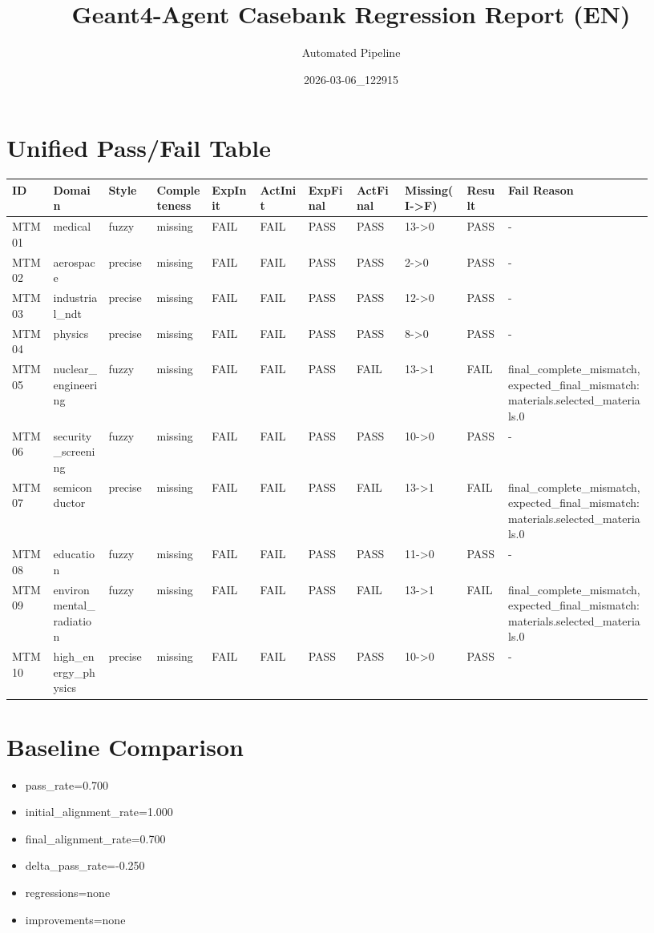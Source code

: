 \documentclass[11pt]{ctexart}
\title{Geant4-Agent Casebank Regression Report (EN)}
\author{Automated Pipeline}
\date{2026-03-06\_122915}
\begin{document}
\maketitle
\section{Unified Pass/Fail Table}
\begin{longtable}{p{0.06\linewidth}p{0.08\linewidth}p{0.07\linewidth}p{0.08\linewidth}p{0.07\linewidth}p{0.07\linewidth}p{0.07\linewidth}p{0.07\linewidth}p{0.09\linewidth}p{0.06\linewidth}p{0.21\linewidth}}
\toprule
ID & Domain & Style & Completeness & ExpInit & ActInit & ExpFinal & ActFinal & Missing(I->F) & Result & Fail Reason \\
\midrule
MTM01 & medical & fuzzy & missing & FAIL & FAIL & PASS & PASS & 13->0 & PASS & - \\
MTM02 & aerospace & precise & missing & FAIL & FAIL & PASS & PASS & 2->0 & PASS & - \\
MTM03 & industrial\_ndt & precise & missing & FAIL & FAIL & PASS & PASS & 12->0 & PASS & - \\
MTM04 & physics & precise & missing & FAIL & FAIL & PASS & PASS & 8->0 & PASS & - \\
MTM05 & nuclear\_engineering & fuzzy & missing & FAIL & FAIL & PASS & FAIL & 13->1 & FAIL & final\_complete\_mismatch, expected\_final\_mismatch:materials.selected\_materials.0 \\
MTM06 & security\_screening & fuzzy & missing & FAIL & FAIL & PASS & PASS & 10->0 & PASS & - \\
MTM07 & semiconductor & precise & missing & FAIL & FAIL & PASS & FAIL & 13->1 & FAIL & final\_complete\_mismatch, expected\_final\_mismatch:materials.selected\_materials.0 \\
MTM08 & education & fuzzy & missing & FAIL & FAIL & PASS & PASS & 11->0 & PASS & - \\
MTM09 & environmental\_radiation & fuzzy & missing & FAIL & FAIL & PASS & FAIL & 13->1 & FAIL & final\_complete\_mismatch, expected\_final\_mismatch:materials.selected\_materials.0 \\
MTM10 & high\_energy\_physics & precise & missing & FAIL & FAIL & PASS & PASS & 10->0 & PASS & - \\
\bottomrule
\end{longtable}
\section{Baseline Comparison}
\begin{itemize}
\item pass\_rate=0.700
\item initial\_alignment\_rate=1.000
\item final\_alignment\_rate=0.700
\item delta\_pass\_rate=-0.250
\item regressions=none
\item improvements=none
\end{itemize}
\appendix
\end{document}
